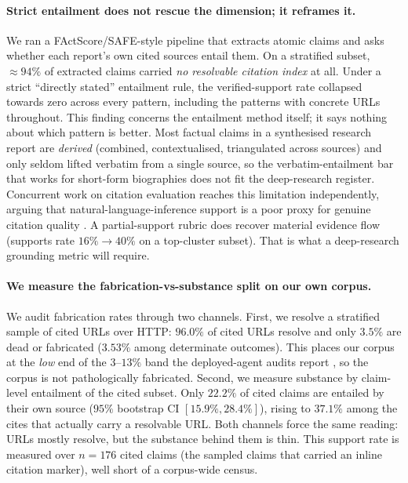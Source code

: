 \documentclass[11pt]{article}
\begin{document}
\paragraph{Strict entailment does not rescue the dimension; it reframes it.} We ran a
FActScore/SAFE-style \citep{min2023factscore,wei2024safe} pipeline that extracts atomic
claims and asks whether each report's own cited sources entail them. On a stratified
subset, $\approx\!94\%$ of extracted claims carried \emph{no resolvable citation index}
at all. Under a strict ``directly stated'' entailment rule, the verified-support rate
collapsed towards zero across every pattern, including the patterns with concrete URLs
throughout. This finding concerns the entailment method itself; it says nothing about
which pattern is better. Most factual claims in a
synthesised research report are \emph{derived} (combined, contextualised, triangulated
across sources) and only seldom lifted verbatim from a single source, so the
verbatim-entailment bar that works for short-form biographies does not fit the
deep-research register. Concurrent work on citation evaluation reaches this limitation
independently, arguing that natural-language-inference support is a poor proxy for genuine
citation quality \citep{xu2025citeeval}. A partial-support rubric does recover material evidence flow
(supports rate $16\%\to40\%$ on a top-cluster subset). That is what a deep-research
grounding metric will require.

\paragraph{We measure the fabrication-vs-substance split on our own corpus.} We audit
fabrication rates through two channels.
First, we resolve a stratified sample of cited URLs over
HTTP: $96.0\%$ of cited URLs resolve and only $3.5\%$ are dead or fabricated
($3.53\%$ among determinate outcomes). This places our corpus at the \emph{low} end of the
$3$--$13\%$ band the deployed-agent audits report \citep{refhalluc2026,citednotverified2026}, so
the corpus is not pathologically fabricated. Second, we measure substance by claim-level
entailment of the cited subset. Only $22.2\%$ of cited claims are entailed by their own source
($95\%$ bootstrap CI $[15.9\%, 28.4\%]$), rising to $37.1\%$ among the cites that actually carry
a resolvable URL. Both channels force the same reading: URLs mostly resolve,
but the substance behind them is thin. This support rate is measured over
$n{=}176$ cited claims (the sampled claims that carried an inline citation marker), well
short of a corpus-wide census.
\end{document}
